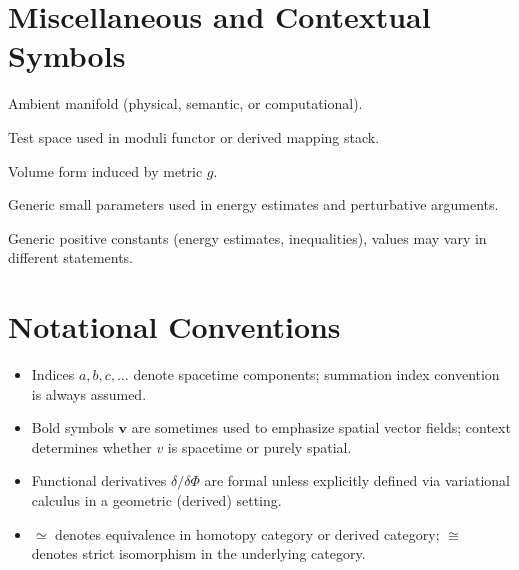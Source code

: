 \documentclass[12pt]{article}
\theoremstyle{plain}
\theoremstyle{definition}
\theoremstyle{remark}
\begin{document}
\section{Miscellaneous and Contextual Symbols}

\begin{description}[leftmargin=2.5cm,style=nextline]

\item[$X$]
Ambient manifold (physical, semantic, or computational).

\item[$U$]
Test space used in moduli functor or derived mapping stack.

\item[$dV_g$]
Volume form induced by metric $g$.

\item[$\epsilon_i$]
Generic small parameters used in energy estimates and perturbative arguments.

\item[$C$, $C_1$, $C_2$]
Generic positive constants (energy estimates, inequalities), values may vary
in different statements.

\end{description}


\section*{Notational Conventions}

\begin{itemize}

\item Indices $a,b,c,\dots$ denote spacetime components; summation index
convention is always assumed.

\item Bold symbols $\bm{v}$ are sometimes used to emphasize spatial vector
fields; context determines whether $v$ is spacetime or purely spatial.

\item Functional derivatives $\delta/\delta \Phi$ are formal unless explicitly
defined via variational calculus in a geometric (derived) setting.

\item $\simeq$ denotes equivalence in homotopy category or derived category;
$\cong$ denotes strict isomorphism in the underlying category.

\end{itemize}
\end{document}
